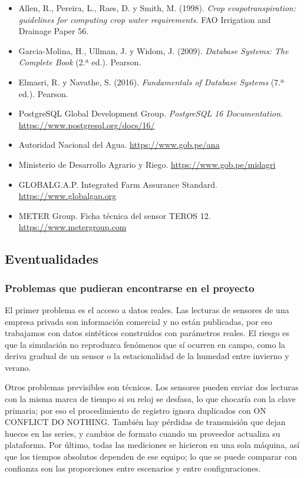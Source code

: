 \documentclass[11pt,letterpaper]{article}
\newcommand{\tbus}{\textunderscore\allowbreak}
\newcommand{\tb}[1]{{\ttfamily\let\_\tbus #1}}
\begin{document}
\begin{itemize}[leftmargin=1.4em,itemsep=0.1em]
\item Allen, R., Pereira, L., Raes, D. y Smith, M. (1998). \textit{Crop evapotranspiration: guidelines for computing crop water requirements}. FAO Irrigation and Drainage Paper 56.
\item Garcia-Molina, H., Ullman, J. y Widom, J. (2009). \textit{Database Systems: The Complete Book} (2.ª ed.). Pearson.
\item Elmasri, R. y Navathe, S. (2016). \textit{Fundamentals of Database Systems} (7.ª ed.). Pearson.
\item PostgreSQL Global Development Group. \textit{PostgreSQL 16 Documentation}. \url{https://www.postgresql.org/docs/16/}
\item Autoridad Nacional del Agua. \url{https://www.gob.pe/ana}
\item Ministerio de Desarrollo Agrario y Riego. \url{https://www.gob.pe/midagri}
\item GLOBALG.A.P. Integrated Farm Assurance Standard. \url{https://www.globalgap.org}
\item METER Group. Ficha técnica del sensor TEROS 12. \url{https://www.metergroup.com}
\end{itemize}

\subsection{Eventualidades}

\subsubsection{Problemas que pudieran encontrarse en el proyecto}

El primer problema es el acceso a datos reales. Las lecturas de sensores de una empresa privada son información comercial y no están publicadas, por eso trabajamos con datos sintéticos construidos con parámetros reales. El riesgo es que la simulación no reproduzca fenómenos que sí ocurren en campo, como la deriva gradual de un sensor o la estacionalidad de la humedad entre invierno y verano.

Otros problemas previsibles son técnicos. Los sensores pueden enviar dos lecturas con la misma marca de tiempo si su reloj se desfasa, lo que chocaría con la clave primaria; por eso el procedimiento de registro ignora duplicados con \tb{ON CONFLICT DO NOTHING}. También hay pérdidas de transmisión que dejan huecos en las series, y cambios de formato cuando un proveedor actualiza su plataforma. Por último, todas las mediciones se hicieron en una sola máquina, así que los tiempos absolutos dependen de ese equipo; lo que se puede comparar con confianza son las proporciones entre escenarios y entre configuraciones.
\end{document}
